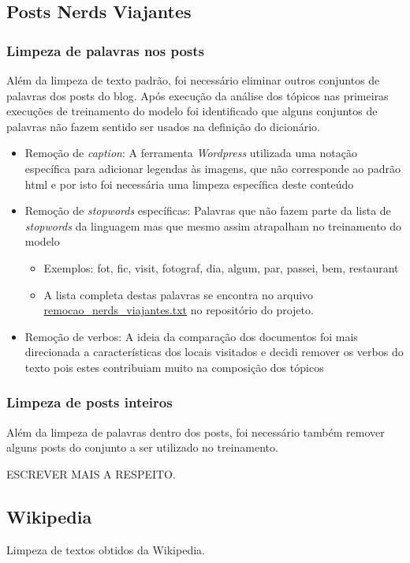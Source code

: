 \subsection{Posts Nerds Viajantes}

\subsubsection{Limpeza de palavras nos posts}

Além da limpeza de texto padrão, foi necessário eliminar outros conjuntos de palavras dos posts do blog. Após execução da análise dos tópicos nas primeiras 
execuções de treinamento do modelo foi identificado que alguns conjuntos de palavras não fazem sentido ser usados na definição do dicionário.

\begin{itemize}
    \item Remoção de \textit{caption}: A ferramenta \textit{Wordpress} utilizada uma notação específica para adicionar legendas às imagens, que não corresponde ao padrão html e por isto foi necessária uma limpeza específica deste conteúdo
    \item Remoção de \textit{stopwords} específicas: Palavras que não fazem parte da lista de \textit{stopwords} da linguagem mas que mesmo assim 
    atrapalham no treinamento do modelo
    \begin{itemize}
        \item Exemplos: fot, fic, visit, fotograf, dia, algum, par, passei, bem, restaurant
        \item A lista completa destas palavras se encontra no arquivo \href{https://github.com/heldergr/tcc-pucmg-2/blob/main/src/python/notebooks/data/remocao_nerds_viajantes.txt}{remocao\_nerds\_viajantes.txt} no repositório do projeto.
    \end{itemize}
    \item Remoção de verbos: A ideia da comparação dos documentos foi mais direcionada a características dos locais visitados e decidi remover os verbos do texto pois estes contribuiam muito na composição dos tópicos
\end{itemize}

\subsubsection{Limpeza de posts inteiros}

Além da limpeza de palavras dentro dos posts, foi necessário também remover alguns posts do conjunto a ser utilizado no treinamento.

ESCREVER MAIS A RESPEITO.

\subsection{Wikipedia}

Limpeza de textos obtidos da Wikipedia.
